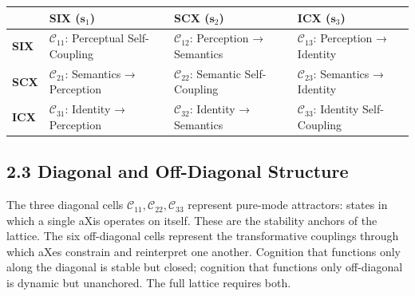 {\def\LTcaptype{none} %
\begin{longtable}[]{@{}
  >{\raggedright\arraybackslash}p{}
  >{\raggedright\arraybackslash}p{}
  >{\raggedright\arraybackslash}p{}
  >{\raggedright\arraybackslash}p{}@{}}
\toprule\noalign{}
\begin{minipage}[b]{\linewidth}\raggedright
\end{minipage} & \begin{minipage}[b]{\linewidth}\raggedright
SIX (\(\mathbf{s}_1\))
\end{minipage} & \begin{minipage}[b]{\linewidth}\raggedright
SCX (\(\mathbf{s}_2\))
\end{minipage} & \begin{minipage}[b]{\linewidth}\raggedright
ICX (\(\mathbf{s}_3\))
\end{minipage} \\
\midrule\noalign{}
\endhead
\bottomrule\noalign{}
\endlastfoot
\textbf{SIX} & \(\mathcal{C}_{11}\): Perceptual Self-Coupling & \(\mathcal{C}_{12}\): Perception → Semantics & \(\mathcal{C}_{13}\): Perception → Identity \\
\textbf{SCX} & \(\mathcal{C}_{21}\): Semantics → Perception & \(\mathcal{C}_{22}\): Semantic Self-Coupling & \(\mathcal{C}_{23}\): Semantics → Identity \\
\textbf{ICX} & \(\mathcal{C}_{31}\): Identity → Perception & \(\mathcal{C}_{32}\): Identity → Semantics & \(\mathcal{C}_{33}\): Identity Self-Coupling \\
\end{longtable}
}

\subsection{2.3 Diagonal and Off-Diagonal Structure}\label{diagonal-and-off-diagonal-structure}

The three diagonal cells \(\mathcal{C}_{11}, \mathcal{C}_{22}, \mathcal{C}_{33}\) represent pure-mode attractors: states in which a single aXis operates on itself. These are the stability anchors of the lattice. The six off-diagonal cells represent the transformative couplings through which aXes constrain and reinterpret one another. Cognition that functions only along the diagonal is stable but closed; cognition that functions only off-diagonal is dynamic but unanchored. The full lattice requires both.


